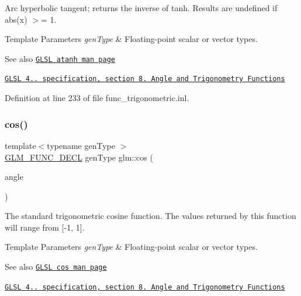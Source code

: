 Arc hyperbolic tangent; returns the inverse of tanh. Results are undefined if abs(x) $>$= 1.


\begin{DoxyTemplParams}{Template Parameters}
{\em gen\+Type} & Floating-\/point scalar or vector types.\\
\hline
\end{DoxyTemplParams}
\begin{DoxySeeAlso}{See also}
\href{http://www.opengl.org/sdk/docs/manglsl/xhtml/atanh.xml}{\tt G\+L\+SL atanh man page} 

\href{http://www.opengl.org/registry/doc/GLSLangSpec.4.20.8.pdf}{\tt G\+L\+SL 4.. specification, section 8. Angle and Trigonometry Functions} 
\end{DoxySeeAlso}


Definition at line 233 of file func\+\_\+trigonometric.\+inl.

\mbox{\label{group__core__func__trigonometric_gac6708d4f0895dc79b65f50db00840167}} 
\subsubsection{\texorpdfstring{cos()}{cos()}}
{\footnotesize\ttfamily template$<$typename gen\+Type $>$ \\
\hyperlink{setup_8hpp_ab2d052de21a70539923e9bcbf6e83a51}{G\+L\+M\+\_\+\+F\+U\+N\+C\+\_\+\+D\+E\+CL} gen\+Type glm\+::cos (\begin{DoxyParamCaption}\item[{gen\+Type const \&}]{angle }\end{DoxyParamCaption})}

The standard trigonometric cosine function. The values returned by this function will range from \mbox{[}-\/1, 1\mbox{]}.


\begin{DoxyTemplParams}{Template Parameters}
{\em gen\+Type} & Floating-\/point scalar or vector types.\\
\hline
\end{DoxyTemplParams}
\begin{DoxySeeAlso}{See also}
\href{http://www.opengl.org/sdk/docs/manglsl/xhtml/cos.xml}{\tt G\+L\+SL cos man page} 

\href{http://www.opengl.org/registry/doc/GLSLangSpec.4.20.8.pdf}{\tt G\+L\+SL 4.. specification, section 8. Angle and Trigonometry Functions} 
\end{DoxySeeAlso}


